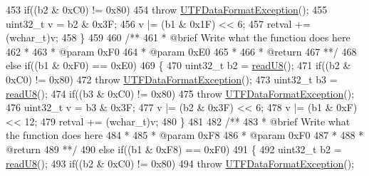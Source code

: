 \begin{DoxyCode}
453                     \textcolor{keywordflow}{if}((b2 & 0xC0) != 0x80)
454                         \textcolor{keywordflow}{throw} \hyperlink{classUTFDataFormatException}{UTFDataFormatException}();
455                     uint32\_t v = b2 & 0x3F;
456                     v |= (b1 & 0x1F) << 6;
457                     retval += (wchar\_t)v;
458                 \}
459 \textcolor{comment}{}
460 \textcolor{comment}{                /**}
461 \textcolor{comment}{                 * @brief Write what the function does here}
462 \textcolor{comment}{                 *}
463 \textcolor{comment}{                 * @param 0xF0}
464 \textcolor{comment}{                 * @param 0xE0}
465 \textcolor{comment}{                 *}
466 \textcolor{comment}{                 * @return}
467 \textcolor{comment}{                 **/}
468                 \textcolor{keywordflow}{else} \textcolor{keywordflow}{if}((b1 & 0xF0) == 0xE0)
469                 \{
470                     uint32\_t b2 = \hyperlink{classReader_a32e2703dfc40dd59216b648a0cf7ce2c}{readU8}();
471                     \textcolor{keywordflow}{if}((b2 & 0xC0) != 0x80)
472                         \textcolor{keywordflow}{throw} \hyperlink{classUTFDataFormatException}{UTFDataFormatException}();
473                     uint32\_t b3 = \hyperlink{classReader_a32e2703dfc40dd59216b648a0cf7ce2c}{readU8}();
474                     \textcolor{keywordflow}{if}((b3 & 0xC0) != 0x80)
475                         \textcolor{keywordflow}{throw} \hyperlink{classUTFDataFormatException}{UTFDataFormatException}();
476                     uint32\_t v = b3 & 0x3F;
477                     v |= (b2 & 0x3F) << 6;
478                     v |= (b1 & 0xF) << 12;
479                     retval += (wchar\_t)v;
480                 \}
481 \textcolor{comment}{}
482 \textcolor{comment}{                /**}
483 \textcolor{comment}{                 * @brief Write what the function does here}
484 \textcolor{comment}{                 *}
485 \textcolor{comment}{                 * @param 0xF8}
486 \textcolor{comment}{                 * @param 0xF0}
487 \textcolor{comment}{                 *}
488 \textcolor{comment}{                 * @return}
489 \textcolor{comment}{                 **/}
490                 \textcolor{keywordflow}{else} \textcolor{keywordflow}{if}((b1 & 0xF8) == 0xF0)
491                 \{
492                     uint32\_t b2 = \hyperlink{classReader_a32e2703dfc40dd59216b648a0cf7ce2c}{readU8}();
493                     \textcolor{keywordflow}{if}((b2 & 0xC0) != 0x80)
494                         \textcolor{keywordflow}{throw} \hyperlink{classUTFDataFormatException}{UTFDataFormatException}();

\end{DoxyCode}
